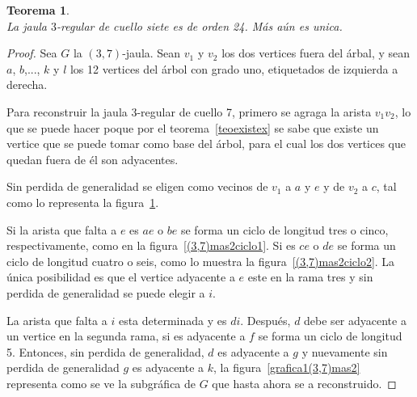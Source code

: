 \documentclass[12pt]{book}
\newtheorem{theorem}{Teorema}
\theoremstyle{definition}
\begin{document}
\begin{theorem}\textbf{}\\
La jaula $3$-regular de cuello siete es de orden 24. Más aún es unica. 
\end{theorem}

\begin{proof}
Sea $G$ la $(3,7)$-jaula. Sean $v_1$ y $v_2$ los dos vertices fuera
del árbal, y sean $a$, $b$,..., $k$ y $l$ los 12 vertices del árbol
con grado uno, etiquetados de izquierda a derecha.

Para reconstruir la jaula 3-regular de cuello 7, primero se agraga la
arista $v_1v_2$, lo que se puede hacer poque por el
teorema~\ref{teoexistex} se sabe que existe un vertice que se puede
tomar como base del árbol, para el cual los dos vertices que quedan fuera de él son adyacentes.

Sin perdida de generalidad se eligen como vecinos de
$v_1$ a $a$ y $e$ y de $v_2$ a $c$, tal como lo representa la figura~\ref{grafica(3,7)mas2}.

\begin{figure}
  \centering
  \caption{} \label{grafica(3,7)mas2}
\end{figure}


Si la arista que falta a $e$ es $ae$ o $be$ se forma un ciclo de
longitud tres o cinco, respectivamente, como en la figura~\ref{(3,7)mas2ciclo1}.
Si es $ce$ o $de$ se forma un ciclo de longitud cuatro o seis,
como lo muestra la figura~\ref{(3,7)mas2ciclo2}. La única posibilidad es que
el vertice adyacente a $e$ este en la rama tres y sin perdida de
generalidad se puede elegir a $i$.

La arista que falta a $i$ esta determinada y es $di$.
Después, $d$ debe ser adyacente a un vertice en la segunda rama, si es
adyacente a $f$ se forma un ciclo de longitud 5.
Entonces, sin perdida de generalidad, $d$ es adyacente a $g$ y nuevamente sin
perdida de generalidad $g$ es adyacente a $k$, la
figura~\ref{grafica1(3,7)mas2} representa como se ve la subgráfica de
$G$ que hasta ahora se a reconstruido.


\end{proof}
\end{document}
